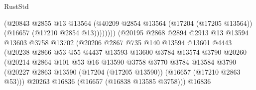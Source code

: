 \begin{lexlean}{RustStd}
\begin{coremodule}
                                        (@20843
                                          @2855
                                          @13
                                          @13564
                                          (@40209
                                            @2854
                                            @13564
                                            (@17204 (@17205 @13564))
                                            (@16657 (@17210 @2854 @13))))))))
                                (@20195
                                  @2868
                                  @2894
                                  @2913
                                  @13
                                  @13594
                                  @13603
                                  @3758
                                  @13702
                                  (@20206
                                    @2867
                                    @735
                                    @140
                                    @13594
                                    @13601
                                    @4443
                                    (@20238
                                      @2866
                                      @53
                                      @55
                                      @4437
                                      @13593
                                      @13600
                                      @3784
                                      @13574
                                      @3790
                                      @20260
                                      (@20214
                                        @2864
                                        @101
                                        @53
                                        @16
                                        @13590
                                        @3758
                                        @3770
                                        @3784
                                        @13584
                                        @3790
                                        (@20227
                                          @2863
                                          @13590
                                          (@17204 (@17205 @13590))
                                          (@16657 (@17210 @2863 @53)))
                                        @20263
                                        @16836
                                        (@16657 (@16838 @13585 @3758)))
                                      @16836

\end{coremodule}
\end{lexlean}
